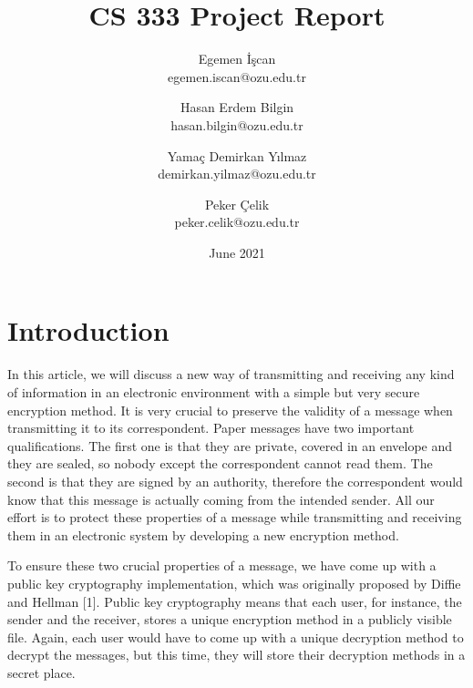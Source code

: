 \documentclass[12pt, letterpaper]{article}
\begin{document}
\title{\huge\textbf{CS 333 Project Report}}
\author{
Egemen İşcan\\
egemen.iscan@ozu.edu.tr
\and
Hasan Erdem Bilgin\\
hasan.bilgin@ozu.edu.tr
\and
Yamaç Demirkan Yılmaz\\
demirkan.yilmaz@ozu.edu.tr
\and
Peker Çelik\\
peker.celik@ozu.edu.tr
}
\date{June 2021}

\renewcommand\thesection{\Roman{section}.}
\renewcommand{\thesubsection}{\Alph{subsection}.}
\setlength{\parindent}{4em}
\setlength{\parskip}{1em}

\maketitle
\newpage

\begin{spacing}{0.01}
  \tableofcontents
\end{spacing}

\newpage

\section{Introduction}

In this article, we will discuss a new way of transmitting and receiving any kind of information in an electronic environment with a simple but very secure encryption method. It is very crucial to preserve the validity of a message when transmitting it to its correspondent. Paper messages have two important qualifications. The first one is that they are private, covered in an envelope and they are sealed, so nobody except the correspondent cannot read them. The second is that they are signed by an authority, therefore the correspondent would know that this message is actually coming from the intended sender. All our effort is to protect these properties of a message while transmitting and receiving them in an electronic system by developing a new encryption method.

To ensure these two crucial properties of a message, we have come up with a public key cryptography implementation, which was originally proposed by Diffie and Hellman [1]. Public key cryptography means that each user, for instance, the sender and the receiver, stores a unique encryption method in a publicly visible file. Again, each user would have to come up with a unique decryption method to decrypt the messages, but this time, they will store their decryption methods in a secret place.
\end{document}
